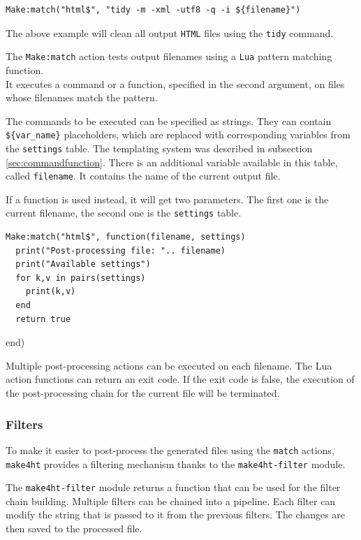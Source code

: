 \begin{verbatim}
Make:match("html$", "tidy -m -xml -utf8 -q -i ${filename}")
\end{verbatim}

The above example will clean all output \texttt{HTML} files using the
\texttt{tidy} command.

The \texttt{Make:match} action tests output filenames using a
\texttt{Lua} pattern matching function.\\
It executes a command or a function, specified in the second argument,
on files whose filenames match the pattern.

The commands to be executed can be specified as strings. They can
contain \texttt{\$\{var\_name\}} placeholders, which are replaced with
corresponding variables from the \texttt{settings} table. The templating
system was described in subsection \ref{sec:commandfunction}. There is
an additional variable available in this table, called
\texttt{filename}. It contains the name of the current output file.

If a function is used instead, it will get two parameters. The first one
is the current filename, the second one is the \texttt{settings} table.

\begin{verbatim}
Make:match("html$", function(filename, settings)
  print("Post-processing file: ".. filename)
  print("Available settings")
  for k,v in pairs(settings)
    print(k,v)
  end
  return true
\end{verbatim}

end)

Multiple post-processing actions can be executed on each filename. The
Lua action functions can return an exit code. If the exit code is false,
the execution of the post-processing chain for the current file will be
terminated.

\subsubsection{Filters}\label{filters}

\label{sec:filters}

To make it easier to post-process the generated files using the
\texttt{match} actions, \texttt{make4ht} provides a filtering mechanism
thanks to the \texttt{make4ht-filter} module.

The \texttt{make4ht-filter} module returns a function that can be used
for the filter chain building. Multiple filters can be chained into a
pipeline. Each filter can modify the string that is passed to it from
the previous filters. The changes are then saved to the processed file.

